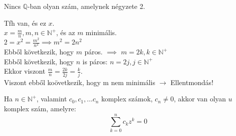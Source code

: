 \documentclass{beamer}
\begin{document}
\begin{frame}

\begin{tcolorbox}[title={Tétel: $\sqrt{2}$ nem racionális}]
Nincs $\mathbb{Q}$-ban olyan szám, amelynek négyzete 2.
\end{tcolorbox}

\begin{tcolorbox}[title={Bizonyítás (Indirekt)}]
Tfh van, és ez $x$.\\
$x = \frac{m}{n}, m,n \in \mathbb{N}^+$, és az $m$ minimális.\\
$2 = x^2 = \frac{m^2}{n^2} \implies m^2 = 2n^2$\\
Ebből következik, hogy $m$ páros. $\implies$ $m = 2k, k \in \mathbb{N}^+$\\
Ebből következik, hogy $n$ is páros: $n = 2j, j \in \mathbb{N}^+$\\
Ekkor viszont $\frac{m}{n} = \frac{2k}{2j} = \frac{k}{j}$.\\
Viszont ebből koövetkezik, hogy m nem minimális $\rightarrow$ Ellentmondás!

\end{tcolorbox}
\end{frame}

\begin{frame}

\begin{tcolorbox}[title={Tétel: Az algebra alaptétele}]
Ha $n \in \mathbb{N}^+$, valamint $c_0, c_1, ... c_n$ komplex számok, $c_n \neq 0$, akkor van olyan $u$ komplex szám, amelyre:\\
$$\sum_{k = 0}^n c_kz^k = 0$$
\end{tcolorbox}

\end{frame}

\begin{frame}[plain]
\end{frame}
\end{document}
